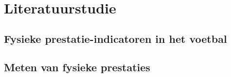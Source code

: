 \chapter{Literatuurstudie}
\label{ch:literatuur}



\section{Fysieke prestatie-indicatoren in het voetbal}
\label{sec:lit-indicatoren}

\section{Meten van fysieke prestaties}
\label{sec:lit-meten}
%
%

